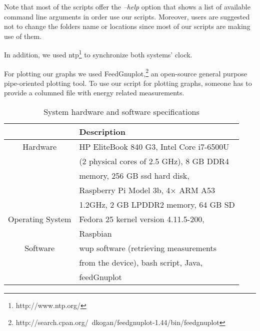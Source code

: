 Note that most of the scripts offer the \textit{--help} option 
that shows a list of available command line arguments in order 
use our scripts.
Moreover, users are suggested not to change the folders name or 
locations since most of our scripts are making use of them. 

In addition, we used {\sc ntp}\footnote{http://www.ntp.org/} to 
synchronize both systems' clock. 

For plotting our graphs we used FeedGnuplot,\footnote{http://search.cpan.org/~dkogan/feedgnuplot-1.44/bin/feedgnuplot} 
an open-source general purpose pipe-oriented plotting tool. 
To use our script for plotting graphs, someone has to provide a 
columned file with energy related measurements.

\begin{table}
		\begin{threeparttable}
	\caption{System hardware and software specifications}
	\label{laptop_specs}
	\begin{tabular}{cl}
		\toprule
		&Description\\
		\midrule
		Hardware	& HP EliteBook 840 G3, Intel Core i7-6500U \\
					& (2 physical cores of 2.5 GHz), 8 GB DDR4  \\
					& memory, 256 GB {\sc ssd}  hard disk, \\
					& Raspberry Pi Model 3b, 4× ARM A53 \\
					& 1.2GHz, 2 GB LPDDR2 memory, 64 GB SD\\
		Operating  System & Fedora 25 kernel version 4.11.5-200,  \\
					& Raspbian\\	
		Software 	& {\sc wup} software (retrieving measurements \\
					& from the device), bash script, Java, \\
					& feedGnuplot \\
		\bottomrule
	\end{tabular}
	\end{threeparttable}
\end{table}

